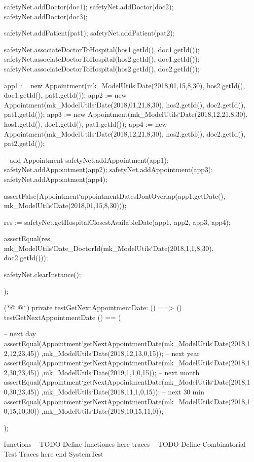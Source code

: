 \begin{vdmpp}[breaklines=true]
  safetyNet.addDoctor(doc1);
  safetyNet.addDoctor(doc2);
  safetyNet.addDoctor(doc3);
  
  safetyNet.addPatient(pat1);
  safetyNet.addPatient(pat2);

  safetyNet.associateDoctorToHospital(hos1.getId(), doc1.getId());
  safetyNet.associateDoctorToHospital(hos2.getId(), doc1.getId());
  safetyNet.associateDoctorToHospital(hos2.getId(), doc2.getId());
  
    
  app1 := new Appointment(mk_ModelUtils`Date(2018,01,15,8,30), hos2.getId(), doc1.getId(), pat1.getId());
  app2 := new Appointment(mk_ModelUtils`Date(2018,01,21,8,30), hos2.getId(), doc2.getId(), pat1.getId());
  app3 := new Appointment(mk_ModelUtils`Date(2018,12,21,8,30), hos1.getId(), doc1.getId(), pat1.getId());
  app4 := new Appointment(mk_ModelUtils`Date(2018,12,21,8,30), hos2.getId(), doc2.getId(), pat2.getId());

    
  -- add Appointment
  safetyNet.addAppointment(app1);
  safetyNet.addAppointment(app2);
  safetyNet.addAppointment(app3);
  safetyNet.addAppointment(app4);
 
  assertFalse(Appointment`appointmentDatesDontOverlap(app1.getDate(), mk_ModelUtils`Date(2018,01,15,8,30)));
  
  res := safetyNet.getHospitalClosestAvailableDate({app1, app2, app3, app4}); 
  
  assertEqual(res, mk_ModelUtils`Date_DoctorId(mk_ModelUtils`Date(2018,1,1,8,30), doc2.getId()));
  
  safetyNet.clearInstance();
    
);


(*@
\label{testGetNextAppointmentDate:964}
@*)
private testGetNextAppointmentDate: () ==> ()
 testGetNextAppointmentDate () == (
 
  -- next day
  assertEqual(Appointment`getNextAppointmentDate(mk_ModelUtils`Date(2018,12,12,23,45)) ,mk_ModelUtils`Date(2018,12,13,0,15));
  -- next year
  assertEqual(Appointment`getNextAppointmentDate(mk_ModelUtils`Date(2018,12,30,23,45)) ,mk_ModelUtils`Date(2019,1,1,0,15));
  -- next month
  assertEqual(Appointment`getNextAppointmentDate(mk_ModelUtils`Date(2018,10,30,23,45)) ,mk_ModelUtils`Date(2018,11,1,0,15));
  -- next 30 min
  assertEqual(Appointment`getNextAppointmentDate(mk_ModelUtils`Date(2018,10,15,10,30)) ,mk_ModelUtils`Date(2018,10,15,11,0));
 
);
 
functions
-- TODO Define functiones here
traces
-- TODO Define Combinatorial Test Traces here
end SystemTest
\end{vdmpp}
